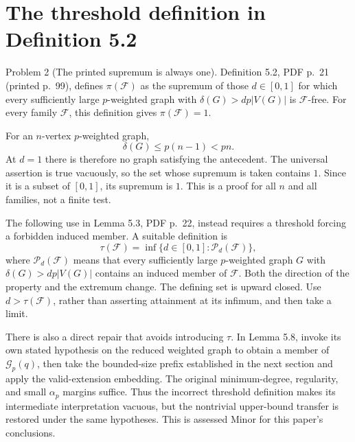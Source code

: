 \documentclass[10pt]{article}
\begin{document}
\section*{The threshold definition in Definition 5.2}
Problem 2 (The printed supremum is always one).  Definition 5.2, PDF p. 21 (printed p. 99), defines \(\pi(\mathcal F)\) as the supremum of those \(d\in[0,1]\) for which every sufficiently large \(p\)-weighted graph with \(\delta(G)>dp|V(G)|\) is \(\mathcal F\)-free. For every family \(\mathcal F\), this definition gives \(\pi(\mathcal F)=1\).\par
For an \(n\)-vertex \(p\)-weighted graph, \[\delta(G)\leq p(n-1)<pn.\] At \(d=1\) there is therefore no graph satisfying the antecedent. The universal assertion is true vacuously, so the set whose supremum is taken contains \(1\). Since it is a subset of \([0,1]\), its supremum is \(1\). This is a proof for all \(n\) and all families, not a finite test.\par
The following use in Lemma 5.3, PDF p. 22, instead requires a threshold forcing a forbidden induced member. A suitable definition is \[\tau(\mathcal F)=\inf\{d\in[0,1]:\mathcal P_d(\mathcal F)\},\] where \(\mathcal P_d(\mathcal F)\) means that every sufficiently large \(p\)-weighted graph \(G\) with \(\delta(G)>dp|V(G)|\) contains an induced member of \(\mathcal F\). Both the direction of the property and the extremum change. The defining set is upward closed. Use \(d>\tau(\mathcal F)\), rather than asserting attainment at its infimum, and then take a limit.\par
There is also a direct repair that avoids introducing \(\tau\). In Lemma 5.8, invoke its own stated hypothesis on the reduced weighted graph to obtain a member of \(\mathcal G_p(q)\), then take the bounded-size prefix established in the next section and apply the valid-extension embedding. The original minimum-degree, regularity, and small \(\alpha_p\) margins suffice. Thus the incorrect threshold definition makes its intermediate interpretation vacuous, but the nontrivial upper-bound transfer is restored under the same hypotheses. This is assessed Minor for this paper’s conclusions.\par
\end{document}
